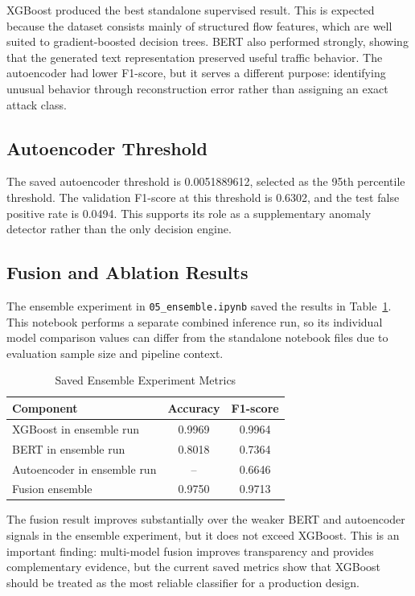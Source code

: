 \documentclass[12pt,a4paper]{article}
\begin{document}
XGBoost produced the best standalone supervised result. This is expected because the dataset consists mainly of structured flow features, which are well suited to gradient-boosted decision trees. BERT also performed strongly, showing that the generated text representation preserved useful traffic behavior. The autoencoder had lower F1-score, but it serves a different purpose: identifying unusual behavior through reconstruction error rather than assigning an exact attack class.

\subsection{Autoencoder Threshold}

The saved autoencoder threshold is 0.0051889612, selected as the 95th percentile threshold. The validation F1-score at this threshold is 0.6302, and the test false positive rate is 0.0494. This supports its role as a supplementary anomaly detector rather than the only decision engine.

\subsection{Fusion and Ablation Results}

The ensemble experiment in \texttt{05\_ensemble.ipynb} saved the results in Table~\ref{tab:ensemble_results}. This notebook performs a separate combined inference run, so its individual model comparison values can differ from the standalone notebook files due to evaluation sample size and pipeline context.

\begin{table}[H]
\centering
\caption{Saved Ensemble Experiment Metrics}
\label{tab:ensemble_results}
\small
\begin{tabular}{l c c}
\toprule
Component & Accuracy & F1-score \\
\midrule
XGBoost in ensemble run & 0.9969 & 0.9964 \\
BERT in ensemble run & 0.8018 & 0.7364 \\
Autoencoder in ensemble run & -- & 0.6646 \\
Fusion ensemble & 0.9750 & 0.9713 \\
\bottomrule
\end{tabular}
\end{table}

The fusion result improves substantially over the weaker BERT and autoencoder signals in the ensemble experiment, but it does not exceed XGBoost. This is an important finding: multi-model fusion improves transparency and provides complementary evidence, but the current saved metrics show that XGBoost should be treated as the most reliable classifier for a production design.
\end{document}
